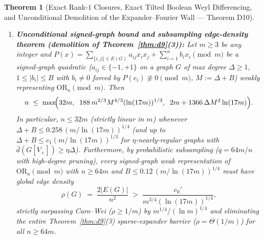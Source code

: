 \documentclass[11pt,a4paper]{article}
\newtheorem{theorem}{Theorem}[section]
\theoremstyle{definition}
\newcommand{\OR}{\mathrm{OR}}
\begin{document}
\begin{theorem}[Exact Rank-$1$ Closures, Exact Tilted Boolean Weyl Differencing, and Unconditional Demolition of the Expander--Fourier Wall --- Theorem D10]
\begin{enumerate}[leftmargin=*,nosep]
  \[
    \sum_{|t| \le T} \mathrm{Re}\, S(t) \;\ge\; L(T),
    \qquad
    M(x; 0.10) \;:=\; L(T) - 2\sum_{t=T+1}^\infty e^{-0.9 x^2 t^2} \;>\; 0.13 \;>\; \frac{1}{8} \qquad (\forall\, x > 0).
  \]
  \item \textbf{Unconditional signed-graph bound and subsampling edge-density theorem (demolition of Theorem~\ref{thm:d9}(3)):} Let $m \ge 3$ be any integer and $P(x) = \sum_{\{i,j\}\in E(G)} a_{ij} x_i x_j + \sum_{i=1}^n b_i x_i \pmod m$ be a signed-graph quadratic ($a_{ij} \in \{-1, +1\}$ on a graph $G$ of max degree $\Delta \ge 1$, $1 \le |b_i| \le B$ with $b_i \neq 0$ forced by $P(e_i) \not\equiv 0 \pmod m$, $M := \Delta + B$) weakly representing $\OR_n \pmod m$. Then
  \[
    n \;\le\; \max\!\Bigl(32 m,\;\; 188\, m^{2/3} M^{4/3} (\ln(17 m))^{1/3},\;\; 2 m + 1366\, \Delta M^2 \ln(17 m)\Bigr).
  \]
  In particular, $n \le 32 m$ (strictly linear in $m$) whenever $\Delta + B \le 0.258\,(m / \ln(17 m))^{1/4}$ (and up to $\Delta + B \le c_1 (m / \ln(17 m))^{1/3}$ for $\eta$-nearly-regular graphs with $\bar{d}(G[V_+]) \ge \eta\Delta$). Furthermore, by probabilistic subsampling ($q = 64m / n$ with high-degree pruning), every signed-graph weak representation of $\OR_n \pmod m$ with $n \ge 64m$ and $B \le 0.12\,(m / \ln(17 m))^{1/4}$ must have global edge density
  \[
    \rho(G) \;=\; \frac{2|E(G)|}{n^2} \;>\; \frac{c_0'}{m^{3/4} (\ln(17 m))^{1/4}},
  \]
  strictly surpassing Caro--Wei ($\rho \ge 1/m$) by $m^{1/4}/(\ln m)^{1/4}$ and eliminating the entire Theorem~\ref{thm:d9}(3) sparse-expander barrier ($\rho = \Theta(1/m)$) for all $n \ge 64m$.
\end{enumerate}
\end{theorem}
\end{document}
